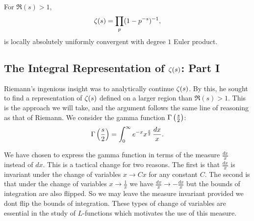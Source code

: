       \begin{theorem}
        For $\Re(s) > 1$,
        \[
          \zeta(s) = \prod_{p}(1-p^{-s})^{-1},
        \]
        is locally absolutely uniformly convergent with degree $1$ Euler product.
      \end{theorem}
    \subsection*{The Integral Representation of \texorpdfstring{$\zeta(s)$}{\z(s)}: Part I}
      Riemann's ingenious insight was to analytically continue $\zeta(s)$. By this, he sought to find a representation of $\zeta(s)$ defined on a larger region than $\Re(s) > 1$. This is the approach we will take, and the argument follows the same line of reasoning as that of Riemann. We consider the gamma function $\Gamma\left(\frac{s}{2}\right)$:
      \[
        \Gamma\left(\frac{s}{2}\right) = \int_{0}^{\infty}e^{-x}x^{\frac{s}{2}}\,\frac{dx}{x}.
      \]

      \begin{remark}
        We have chosen to express the gamma function in terms of the measure $\frac{dx}{x}$ instead of $dx$. This is a tactical change for two reasons. The first is that $\frac{dx}{x}$ is invariant under the change of variables $x \to Cx$ for any constant $C$. The second is that under the change of variables $x \to \frac{1}{x}$ we have $\frac{dx}{x} \to -\frac{dx}{x}$ but the bounds of integration are also flipped. So we may leave the measure invariant provided we dont flip the bounds of integration. These types of change of variables are essential in the study of $L$-functions which motivates the use of this measure.
      \end{remark}

